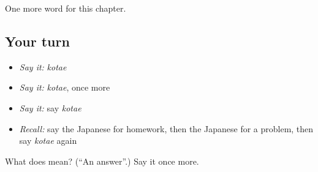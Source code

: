 \begin{grammarlens}[title={What you've built}]
One more word for this chapter.
\end{grammarlens}

\subsection*{Your turn}
\begin{itemize}
\raggedright
  \item \emph{Say it:} \emph{kotae}
  \item \emph{Say it:} \emph{kotae}, once more
  \item \emph{Say it:} say \emph{kotae}
  \item \emph{Recall:} say the Japanese for homework, then the Japanese for a problem, then say \emph{kotae} again
\end{itemize}

\begin{tcolorbox}[breakable,colback=teal!4,colframe=teal!35!black,title={Before you move on}]
What does  mean? (\textquotedblleft{}An answer\textquotedblright{}.) Say it once more.
\end{tcolorbox}
